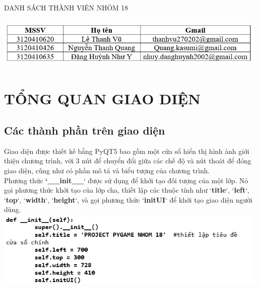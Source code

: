 \documentclass[a4paper]{article}
\begin{document}
\thispagestyle{empty}

\newpage
\begin{center}
DANH SÁCH THÀNH VIÊN NHÓM 18 \\
\end{center}
\vspace{1cm}



\begin{center}
\includegraphics[width=6in,height=1in]{image1_1.png}
\end{center}

\newpage
\tableofcontents
\newpage



\section{TỔNG QUAN GIAO DIỆN}
\subsection{Các thành phần trên giao diện}
Giao diện được thiết kế bằng PyQT5 bao gồm một cửa sổ hiển thị hình ảnh
giới thiệu chương trình, với 3 nút để chuyển đổi giữa các chế độ và nút
thoát để đóng giao diện, cũng như có phần mô tả và biểu tượng của chương
trình. \vspace{1em} \\
Phương thức \textbf{`\_\_init\_\_}` được sử dụng để khởi tạo đối tượng
của một lớp. Nó gọi phương thức khởi tạo của lớp cha, thiết lập các
thuộc tính như `\textbf{title}`, `\textbf{left}`, `\textbf{top}`,
`\textbf{width}`, `\textbf{height}`, và gọi phương thức
`\textbf{initUI}` để khởi tạo giao diện người dùng. \vspace{1em}\\
\includegraphics[width=5.5in,height=1.5in]{image1_2.png}
\end{document}
